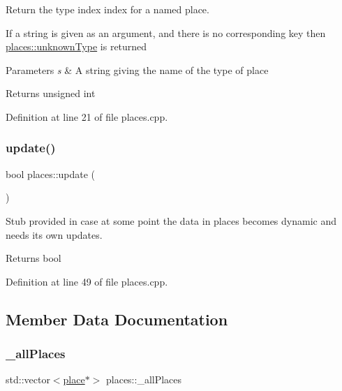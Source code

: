 Return the type index index for a named place. 

If a string is given as an argument, and there is no corresponding key then \mbox{\hyperlink{classplaces_ab03feda32ddd4784c17de8b2185b3563}{places\+::unknown\+Type}} is returned


\begin{DoxyParams}{Parameters}
{\em s} & A string giving the name of the type of place \\
\hline
\end{DoxyParams}
\begin{DoxyReturn}{Returns}
unsigned int 
\end{DoxyReturn}


Definition at line 21 of file places.\+cpp.

\mbox{\label{classplaces_a5ff3d2cd02c18f353ab15dd86f52e7be}} 
\subsubsection{\texorpdfstring{update()}{update()}}
{\footnotesize\ttfamily bool places\+::update (\begin{DoxyParamCaption}{ }\end{DoxyParamCaption})}



Stub provided in case at some point the data in places becomes dynamic and needs its own updates. 

\begin{DoxyReturn}{Returns}
bool 
\end{DoxyReturn}


Definition at line 49 of file places.\+cpp.



\subsection{Member Data Documentation}
\mbox{\label{classplaces_a2cb6b12513a2245fd06b567490229d89}} 
\subsubsection{\texorpdfstring{\+\_\+all\+Places}{\_allPlaces}}
{\footnotesize\ttfamily std\+::vector$<$\mbox{\hyperlink{classplace}{place}}$\ast$$>$ places\+::\+\_\+all\+Places\hspace{0.3cm}{\ttfamily [protected]}}



